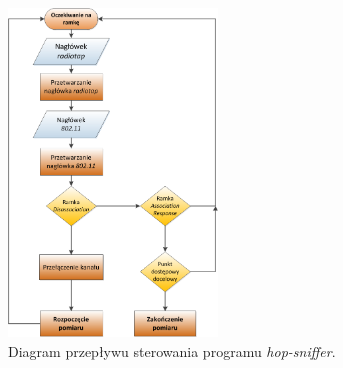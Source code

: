 \begin{figure}[htb]
\begin{center}
\includegraphics[width=210px]{img/FlowDiagram}
\caption{Diagram przepływu sterowania programu \emph{hop-sniffer}.}
\label{FlowDiagram}
\end{center}
\end{figure}























